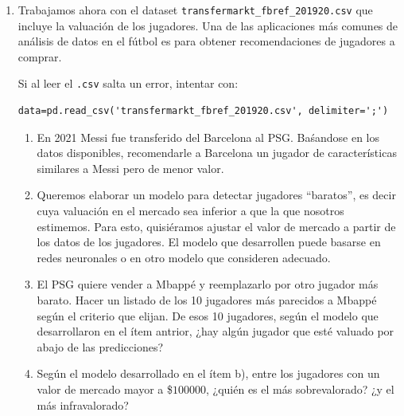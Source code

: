 \documentclass[a4paper,11pt]{article}
\theoremstyle{definition}
\begin{document}
\begin{enumerate}[resume]
\item Trabajamos ahora con el dataset \lstinline{transfermarkt_fbref_201920.csv} que incluye la valuación de los jugadores.
Una de las aplicaciones más comunes de análisis de datos en el fútbol es para obtener recomendaciones de jugadores a comprar.

Si al leer el \verb|.csv| salta un error, intentar con:
\begin{lstlisting}
data=pd.read_csv('transfermarkt_fbref_201920.csv', delimiter=';')
\end{lstlisting}

\begin{enumerate}
\item En 2021 Messi fue transferido del Barcelona al PSG. Baśandose en los datos disponibles, recomendarle a
Barcelona
un jugador de características similares  a Messi pero de menor valor.
\item Queremos elaborar un modelo para detectar jugadores ``baratos'', es decir cuya valuación en el mercado sea
inferior a que la que nosotros estimemos. Para esto, quisiéramos ajustar el valor de mercado a partir de los datos de
los jugadores. El modelo que desarrollen puede basarse en redes neuronales o en otro modelo que consideren adecuado.
\item El PSG quiere vender a Mbappé y reemplazarlo por otro jugador más barato. Hacer un listado de los 10 jugadores
más parecidos a Mbappé según el criterio que elijan. De esos 10 jugadores, según el modelo que desarrollaron en el
ítem antrior, ¿hay algún jugador que esté valuado por abajo de las predicciones?
\item Según el modelo desarrollado en el ítem b), entre los jugadores con un valor de mercado mayor a \$$100000$,
¿quién es el más sobrevalorado? ¿y el más infravalorado?
\end{enumerate}
\end{enumerate}
\end{document}
